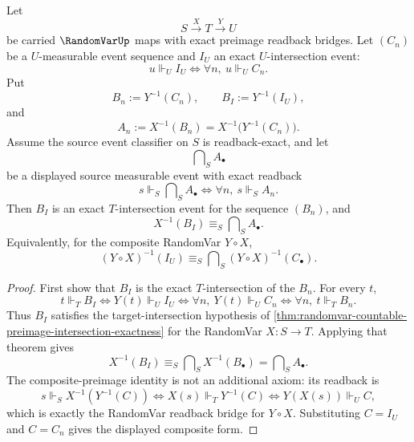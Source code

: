\begin{proposition}
\label{prop:randomvar-composition-countable-preimage-intersections}
Let
$$
S\xrightarrow{X}T\xrightarrow{Y}U
$$
be carried $\RandomVarUp$ maps with exact preimage readback bridges. Let
$(C_n)$ be a $U$-measurable event sequence and $I_U$ an exact $U$-intersection event:
$$
u\Vdash_U I_U\Longleftrightarrow \forall n,\ u\Vdash_U C_n.
$$
Put
$$
B_n:=Y^{-1}(C_n),\qquad B_I:=Y^{-1}(I_U),
$$
and
$$
A_n:=X^{-1}(B_n)=X^{-1}\bigl(Y^{-1}(C_n)\bigr).
$$
Assume the source event classifier on $S$ is readback-exact, and let
$$
\bigcap\nolimits_S A_\bullet
$$
be a displayed source measurable event with exact readback
$$
s\Vdash_S \bigcap\nolimits_S A_\bullet
\Longleftrightarrow
\forall n,\ s\Vdash_S A_n.
$$
Then $B_I$ is an exact $T$-intersection event for the sequence $(B_n)$, and
$$
X^{-1}(B_I)\equiv_S \bigcap\nolimits_S A_\bullet.
$$
Equivalently, for the composite RandomVar $Y\circ X$,
$$
(Y\circ X)^{-1}(I_U)\equiv_S
\bigcap\nolimits_S (Y\circ X)^{-1}(C_\bullet).
$$
\end{proposition}
\begin{proof}
First show that $B_I$ is the exact $T$-intersection of the $B_n$. For every $t$,
$$
t\Vdash_T B_I
\Longleftrightarrow
Y(t)\Vdash_U I_U
\Longleftrightarrow
\forall n,\ Y(t)\Vdash_U C_n
\Longleftrightarrow
\forall n,\ t\Vdash_T B_n.
$$
Thus $B_I$ satisfies the target-intersection hypothesis of \autoref{thm:randomvar-countable-preimage-intersection-exactness} for the
RandomVar $X:S\to T$. Applying that theorem gives
$$
X^{-1}(B_I)\equiv_S \bigcap\nolimits_S X^{-1}(B_\bullet)
=
\bigcap\nolimits_S A_\bullet.
$$
The composite-preimage identity is not an additional axiom: its readback is
$$
s\Vdash_S X^{-1}(Y^{-1}(C))
\Longleftrightarrow
X(s)\Vdash_T Y^{-1}(C)
\Longleftrightarrow
Y(X(s))\Vdash_U C,
$$
which is exactly the RandomVar readback bridge for $Y\circ X$. Substituting $C=I_U$ and
$C=C_n$ gives the displayed composite form.
\end{proof}

